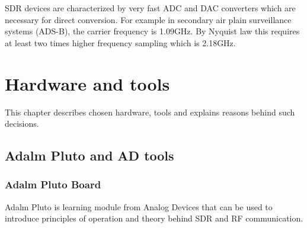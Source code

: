 \documentclass[en,printmode]{mgr}
\begin{document}
		SDR devices are characterized by very fast ADC and DAC converters which are necessary for 
		direct conversion. For example in secondary air plain surveillance systems (ADS-B), the
	    carrier frequency is 1.09GHz. By Nyquist law this requires at least two times higher frequency
	    sampling which is 2.18GHz.
	    
\chapter{Hardware and tools}
	This chapter describes chosen hardware, tools and explains reasons behind such decisions.
	\section{Adalm Pluto and AD tools}
		\subsection*{Adalm Pluto Board}
			Adalm Pluto is learning module from Analog Devices that can be used to introduce 
			principles of operation and theory behind SDR and RF communication.
			
\end{document}
